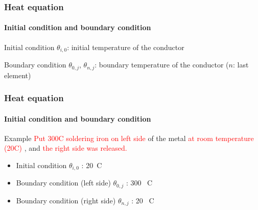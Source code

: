\documentclass[aspectratio=169]{beamer}
\begin{document}
\begin{frame}
    \frametitle{Heat equation}
    \framesubtitle{Initial condition and boundary condition}
    \begin{block}{Initial condition}
        $\theta_{i, 0}$: initial temperature of the conductor
    \end{block}
    \begin{block}{Boundary condition}
        $\theta_{0, j}$, $\theta_{n, j}$: boundary temperature of the conductor ($n$: last element)
    \end{block}
\end{frame}

\begin{frame}
    \frametitle{Heat equation}
    \framesubtitle{Initial condition and boundary condition}
    \begin{block}{Example}
        \textcolor{red}{Put 300\textdegree C soldering iron on left side} of the metal \textcolor{red}{at room temperature (20\textdegree C)} , and \textcolor{red}{the right side was released.}
    \end{block}
    \begin{itemize}
        \item Initial condition $\theta_{i, 0}$ : 20~\textdegree C
        \item Boundary condition (left side) $\theta_{0, j}$ : 300~ \textdegree C
        \item Boundary condition (right side) $\theta_{n, j}$ : 20~ \textdegree C
    
    \end{itemize}
\end{frame}
\end{document}
